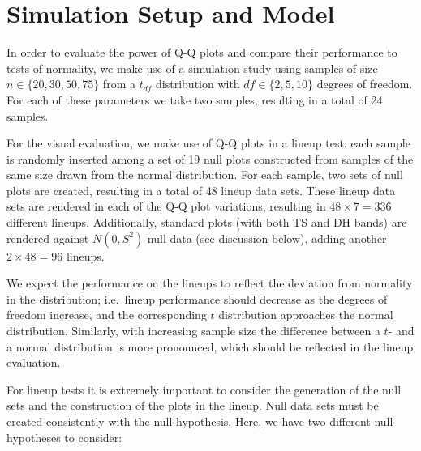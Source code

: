 \documentclass[12pt]{article}\usepackage[]{graphicx}\usepackage[]{color}
\newcommand{\hh}[1]{{\color{magenta} #1}}
\begin{document}

\section{Simulation Setup and Model}\label{sec:simu}

In order to evaluate the power of Q-Q plots and compare their performance to tests of normality, we make use of a simulation study 
using samples of size $n \in \{20, 30, 50, 75\}$ from a $t_{df}$ distribution with $df \in \{2, 5, 10\}$ degrees of freedom. For each of these parameters we take two samples, resulting in a total of 24 samples.

For the visual evaluation, we make use of Q-Q plots in a lineup test: each sample is randomly inserted among a set of 19 null plots constructed from samples of the same size drawn from the normal distribution. For each  sample, two sets of null plots are created, resulting in a total of 48 lineup data sets. 
These lineup data sets are rendered in each of the Q-Q plot variations, resulting in $48 \times 7 = 336$ different lineups.  Additionally, standard plots (with both TS and DH bands) are rendered against $N(0, S^2)$ null data (see discussion below), adding another $2 \times 48 = 96$ lineups.

\hh{We expect the performance on the lineups to reflect the deviation from normality in the distribution; i.e.~lineup performance should decrease as the degrees of freedom increase, and the corresponding $t$ distribution approaches the normal distribution. Similarly, with increasing sample size the difference between a $t$- and a normal distribution is more pronounced, which should be reflected in the lineup evaluation.   }



For lineup tests it is extremely important to consider the generation of the null sets and the construction of the plots in the lineup. 
Null data sets must be created consistently with the null hypothesis. Here, we have two different null hypotheses to consider:
\end{document}
